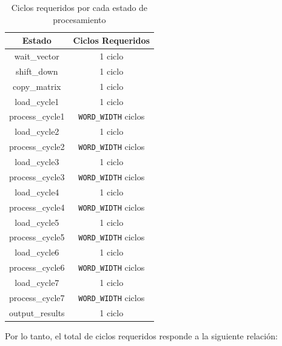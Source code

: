 \begin{table}[htb!]
   \begin{center}
      \small
      \begin{tabular}{|c|c|}
         \hline
         \textbf{Estado} & \textbf{Ciclos Requeridos} \\
         \hline
         \hline
         wait\_vector    & 1 ciclo                    \\ \hline
         shift\_down     & 1 ciclo                    \\ \hline
         copy\_matrix    & 1 ciclo                    \\ \hline
         load\_cycle1    & 1 ciclo                    \\ \hline
         process\_cycle1 & \verb;WORD_WIDTH; ciclos   \\ \hline
         load\_cycle2    & 1 ciclo                    \\ \hline
         process\_cycle2 & \verb;WORD_WIDTH; ciclos   \\ \hline
         load\_cycle3    & 1 ciclo                    \\ \hline
         process\_cycle3 & \verb;WORD_WIDTH; ciclos   \\ \hline
         load\_cycle4    & 1 ciclo                    \\ \hline
         process\_cycle4 & \verb;WORD_WIDTH; ciclos   \\ \hline
         load\_cycle5    & 1 ciclo                    \\ \hline
         process\_cycle5 & \verb;WORD_WIDTH; ciclos   \\ \hline
         load\_cycle6    & 1 ciclo                    \\ \hline
         process\_cycle6 & \verb;WORD_WIDTH; ciclos   \\ \hline
         load\_cycle7    & 1 ciclo                    \\ \hline
         process\_cycle7 & \verb;WORD_WIDTH; ciclos   \\ \hline
         output\_results & 1 ciclo                    \\ \hline
      \end{tabular}
      \caption{Ciclos requeridos por cada estado de procesamiento}
      \normalsize
   \end{center}
\end{table}

Por lo tanto, el total de ciclos requeridos responde a la siguiente relación:

